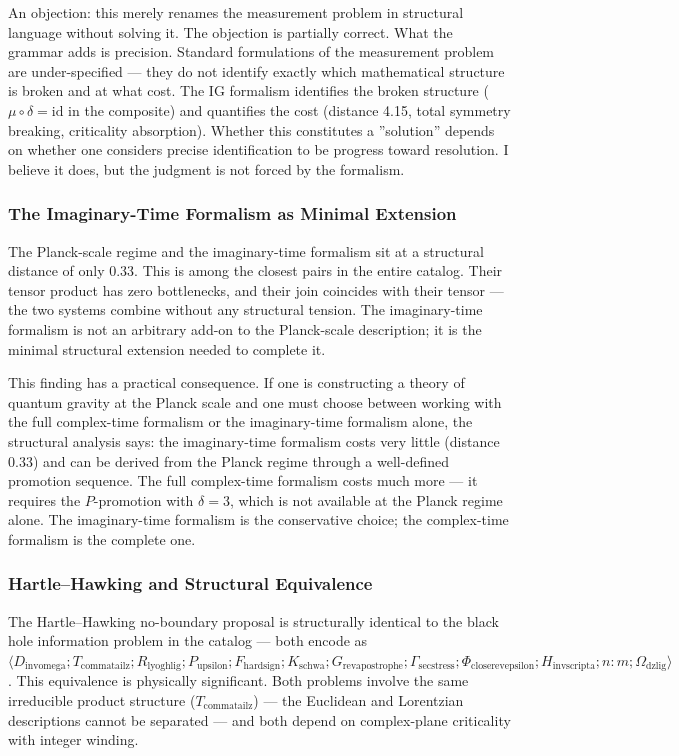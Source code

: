\documentclass[12pt,a4paper]{article}
\begin{document}
An objection: this merely renames the measurement problem in structural language without solving it. The objection is partially correct. What the grammar adds is precision. Standard formulations of the measurement problem are under-specified --- they do not identify exactly which mathematical structure is broken and at what cost. The IG formalism identifies the broken structure ($\mu \circ \delta = \text{id}$ in the composite) and quantifies the cost (distance 4.15, total symmetry breaking, criticality absorption). Whether this constitutes a ''solution'' depends on whether one considers precise identification to be progress toward resolution. I believe it does, but the judgment is not forced by the formalism.

\subsubsection{The Imaginary-Time Formalism as Minimal Extension}

The Planck-scale regime and the imaginary-time formalism sit at a structural distance of only 0.33. This is among the closest pairs in the entire catalog. Their tensor product has zero bottlenecks, and their join coincides with their tensor --- the two systems combine without any structural tension. The imaginary-time formalism is not an arbitrary add-on to the Planck-scale description; it is the minimal structural extension needed to complete it.

This finding has a practical consequence. If one is constructing a theory of quantum gravity at the Planck scale and one must choose between working with the full complex-time formalism or the imaginary-time formalism alone, the structural analysis says: the imaginary-time formalism costs very little (distance 0.33) and can be derived from the Planck regime through a well-defined promotion sequence. The full complex-time formalism costs much more --- it requires the $P$-promotion with $\delta = 3$, which is not available at the Planck regime alone. The imaginary-time formalism is the conservative choice; the complex-time formalism is the complete one.

\subsubsection{Hartle--Hawking and Structural Equivalence}

The Hartle--Hawking no-boundary proposal is structurally identical to the black hole information problem in the catalog --- both encode as $\langle D_{\text{invomega}}; T_{\text{commatailz}}; R_{\text{lyoghlig}}; P_{\text{upsilon}}; F_{\text{hardsign}}; K_{\text{schwa}}; G_{\text{revapostrophe}}; \Gamma_{\text{secstress}}; \Phi_{\text{closerevepsilon}}; H_{\text{invscripta}}; n{:}m; \Omega_{\text{dzlig}} \rangle$. This equivalence is physically significant. Both problems involve the same irreducible product structure ($T_{\text{commatailz}}$) --- the Euclidean and Lorentzian descriptions cannot be separated --- and both depend on complex-plane criticality with integer winding.
\end{document}
